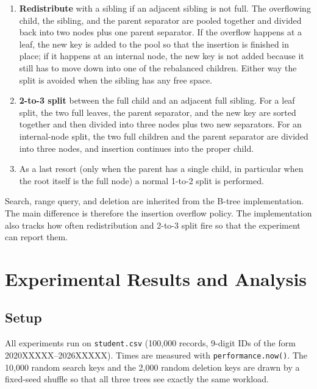 \documentclass[sigconf]{acmart}
\begin{document}
\begin{enumerate}
\item \textbf{Redistribute} with a sibling if an adjacent sibling is
not full. The overflowing child, the sibling, and the parent
separator are pooled together and divided back into two nodes plus
one parent separator. If the overflow happens at a leaf, the new
key is added to the pool so that the insertion is finished in place;
if it happens at an internal node, the new key is not added because
it still has to move down into one of the rebalanced children. Either
way the split is avoided when the sibling has any free space.
\item \textbf{2-to-3 split} between the full child and an adjacent
full sibling. For a leaf split, the two full leaves, the parent
separator, and the new key are sorted together and then divided into
three nodes plus two new separators. For an internal-node split, the
two full children and the parent separator are divided into three
nodes, and insertion continues into the proper child.
\item As a last resort (only when the parent has a single child, in
particular when the root itself is the full node) a normal
1-to-2 split is performed.
\end{enumerate}

Search, range query, and deletion are inherited from the B-tree
implementation. The main difference is therefore the insertion
overflow policy. The implementation also tracks how often
redistribution and 2-to-3 split fire so that the experiment can
report them.

\section{Experimental Results and Analysis}

\subsection{Setup}

All experiments run on \texttt{student.csv} (100{,}000 records,
9-digit IDs of the form 2020XXXXX{--}2026XXXXX). Times are measured
with \texttt{performance.now()}. The 10{,}000 random search keys and
the 2{,}000 random deletion keys are drawn by a fixed-seed shuffle
so that all three trees see exactly the same workload.
\end{document}
